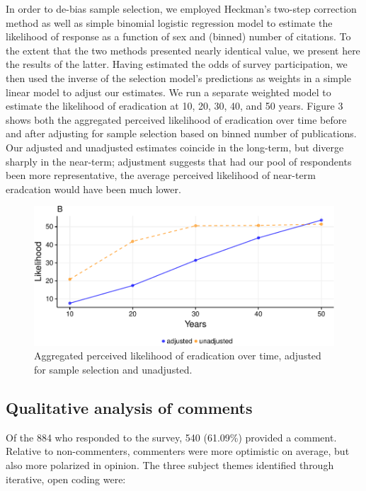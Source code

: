 \documentclass[]{article}
\begin{document}
In order to de-bias sample selection, we employed Heckman's two-step
correction method as well as simple binomial logistic regression model
to estimate the likelihood of response as a function of sex and (binned)
number of citations. To the extent that the two methods presented nearly
identical value, we present here the results of the latter. Having
estimated the odds of survey participation, we then used the inverse of
the selection model's predictions as weights in a simple linear model to
adjust our estimates. We run a separate weighted model to estimate the
likelihood of eradication at 10, 20, 30, 40, and 50 years. Figure 3
shows both the aggregated perceived likelihood of eradication over time
before and after adjusting for sample selection based on binned number
of publications. Our adjusted and unadjusted estimates coincide in the
long-term, but diverge sharply in the near-term; adjustment suggests
that had our pool of respondents been more representative, the average
perceived likelihood of near-term eradcation would have been much lower.

\begin{figure}[h]

{\centering \includegraphics{paper_files/figure-latex/unnamed-chunk-10-1} 

}

\caption{Aggregated perceived likelihood of eradication over time, adjusted for sample selection and unadjusted.}\label{fig:unnamed-chunk-10}
\end{figure}

\subsection{Qualitative analysis of
comments}\label{qualitative-analysis-of-comments}

Of the 884 who responded to the survey, 540 (61.09\%) provided a
comment. Relative to non-commenters, commenters were more optimistic on
average, but also more polarized in opinion. The three subject themes
identified through iterative, open coding were:
\end{document}
